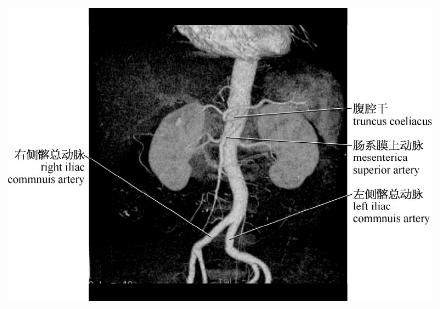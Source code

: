 \begin{figure}[!htbp]
 \centering
 \includegraphics{./images/Image00203.jpg}
  \end{figure} 
 \FloatBarrier


